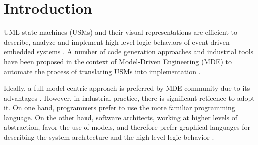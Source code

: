 \section{Introduction}
\label{sec:intro}



UML state machines (USMs) and their visual representations are efficient to describe, analyze and implement high level logic behaviors of event-driven %
embedded systems \cite{Dunkels:2006:PSE:1182807.1182811}. 
A number of code generation approaches and industrial tools have been proposed in the context of Model-Driven Engineering (MDE) \cite{kent2002model} to automate the process of translating USMs into implementation \cite{possepapyrusrt, Douglass1999,Shalyto2006, ibm_rhapsody}.  

Ideally, a full model-centric approach is preferred by MDE community due to its advantages \cite{Selic2012}. 
However, in industrial practice, there is significant reticence \cite{Hutchinson:2011:MEP:1985793.1985882} to adopt it.
On one hand, programmers prefer to
use the more familiar programming language. 
On the other hand, software architects, working at higher levels
of abstraction, favor the use of models, and therefore
prefer graphical languages for describing the system architecture and the high level logic behavior \cite{Hutchinson:2011:MEP:1985793.1985882,Hutchinson:2011:EAM:1985793.1985858}.

